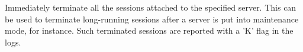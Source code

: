 \subsubsection[shutdown sessions <backend>/<server>]{}

  Immediately terminate all the sessions attached to the specified server. This
  can be used to terminate long-running sessions after a server is put into
  maintenance mode, for instance. Such terminated sessions are reported with a
  'K' flag in the logs.

